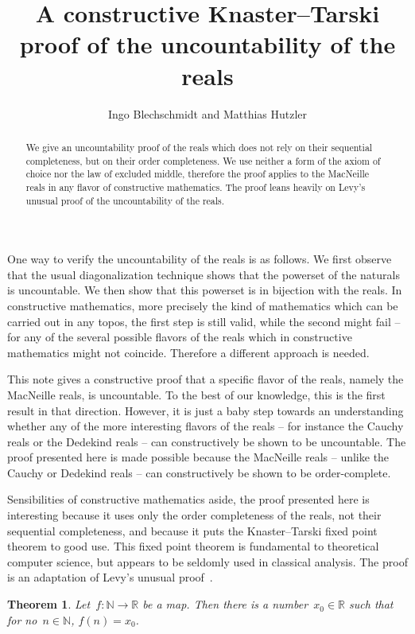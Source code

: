 \documentclass[oneside]{amsart}
\title{A constructive Knaster--Tarski proof of the uncountability of the reals}
\author{Ingo Blechschmidt and Matthias Hutzler}
\newcommand{\NN}{\mathbb{N}}
\newcommand{\RR}{\mathbb{R}}
\theoremstyle{definition}
\theoremstyle{plain}
\newtheorem*{thm*}{Theorem}
\theoremstyle{remark}
\begin{document}
\begin{abstract}
  We give an uncountability proof of the reals which does not rely on their
  sequential completeness, but on their order completeness. We use neither a
  form of the axiom of choice nor the law of excluded middle, therefore
  the proof applies to the MacNeille reals in any flavor of constructive
  mathematics. The proof leans heavily on Levy's unusual proof of the
  uncountability of the reals.
\end{abstract}

\maketitle
\thispagestyle{empty}

One way to verify the uncountability of the reals is as follows. We first
observe that the usual diagonalization technique shows that the powerset of the
naturals is uncountable. We then show that this powerset is in bijection with
the reals. In constructive mathematics, more precisely the kind of mathematics
which can be carried out in any topos, the first step is still valid, while the
second might fail -- for any of the several possible flavors of the reals
which in constructive mathematics might not coincide. Therefore a different
approach is needed.

This note gives a constructive proof that a specific flavor of the reals,
namely the MacNeille reals, is uncountable. To the best of our knowledge, this
is the first result in that direction. However, it is just a baby step towards
an understanding whether any of the more interesting flavors of the reals --
for instance the Cauchy reals or the Dedekind reals -- can constructively be
shown to be uncountable. The proof presented here is made possible because the
MacNeille reals -- unlike the Cauchy or Dedekind reals -- can constructively be
shown to be order-complete.

Sensibilities of constructive mathematics aside, the proof presented here is
interesting because it uses only the order completeness of the reals, not their
sequential completeness, and because it puts the Knaster--Tarski fixed point
theorem to good use. This fixed point theorem is fundamental to theoretical
computer science, but appears to be seldomly used in classical analysis.
The proof is an adaptation of Levy's unusual proof~\cite{levy}.

\begin{thm*}Let~$f : \NN \to \RR$ be a map. Then there is a number~$x_0 \in \RR$
such that for no~$n \in \NN$, $f(n) = x_0$.\end{thm*}
\end{document}
